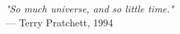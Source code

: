 \begin{flushright}
\emph{"So much universe, and so little time."}\\
--- Terry Pratchett, 1994
\end{flushright}
